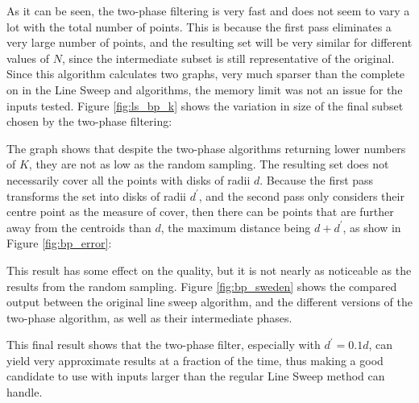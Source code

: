 As it can be seen, the two-phase filtering is very fast and does not seem to vary a lot with the total number of points. This is because the first pass eliminates a very large number of points, and the resulting set will be very similar for different values of $N$, since the intermediate subset is still representative of the original. Since this algorithm calculates two graphs, very much sparser than the complete on in the Line Sweep and \kdtree algorithms, the memory limit was not an issue for the inputs tested. Figure \ref{fig:ls_bp_k} shows the variation in size of the final subset chosen by the two-phase filtering:





The graph shows that despite the two-phase algorithms returning lower numbers of $K$, they are not as low as the random sampling. The resulting set does not necessarily cover all the points with disks of radii $d$. Because the first pass transforms the set into disks of radii $d^\prime$, and the second pass only considers their centre point as the measure of cover, then there can be points that are further away from the centroids than $d$, the maximum distance being $d+d^\prime$, as show in Figure \ref{fig:bp_error}:



This result has some effect on the quality, but it is not nearly as noticeable as the results from the random sampling. Figure \ref{fig:bp_sweden} shows the compared output between the original line sweep algorithm, and the different versions of the two-phase algorithm, as well as their intermediate phases.



This final result shows that the two-phase filter, especially with $d^\prime=0.1d$, can yield very approximate results at a fraction of the time, thus making a good candidate to use with inputs larger than the regular Line Sweep method can handle.

